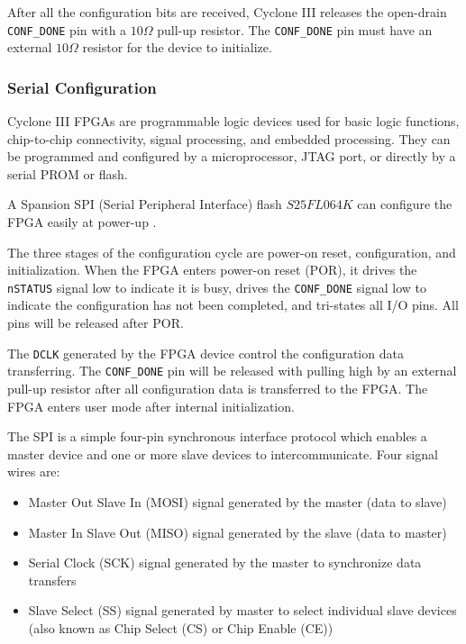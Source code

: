 After all the configuration bits are received, Cyclone III releases the open-drain \texttt{CONF\_DONE} pin with a $10\Omega$ pull-up resistor. The
\texttt{CONF\_DONE} pin must have an external $10\Omega$ resistor for the device to initialize.


\subsubsection{Serial Configuration}

Cyclone III FPGAs are programmable logic devices used for basic logic functions, 
chip-to-chip connectivity, signal processing, and embedded processing. They can
be programmed and configured by a microprocessor, JTAG port, or directly by a
serial PROM or flash.

A Spansion SPI (Serial Peripheral Interface) flash $S25FL064K$ can configure the FPGA easily at power-up \citep{Spansion:2011:appnote}.

The three stages of the configuration cycle are power-on reset, configuration, and initialization.
When the FPGA enters power-on reset (POR), it drives the \texttt{nSTATUS} signal low to indicate it is busy,
drives the \texttt{CONF\_DONE} signal low to indicate the configuration has not been completed, and tri-states all I/O pins.
All pins will be released after POR.

The \texttt{DCLK} generated by the FPGA device control the configuration data transferring.
The \texttt{CONF\_DONE} pin will be released with pulling high by an external pull-up
resistor after all configuration data is transferred to the FPGA. The FPGA enters user mode after internal initialization.

The SPI is a simple four-pin synchronous interface protocol which enables a master device and one or more slave devices to intercommunicate. Four signal wires are:
\begin{itemize}
 \item Master Out Slave In (MOSI) signal generated by the master (data to slave)
 \item Master In Slave Out (MISO) signal generated by the slave (data to master)
 \item Serial Clock (SCK) signal generated by the master to synchronize data transfers
 \item Slave Select (SS) signal generated by master to select individual slave devices (also known as Chip Select (CS) or Chip Enable (CE))
\end{itemize}


